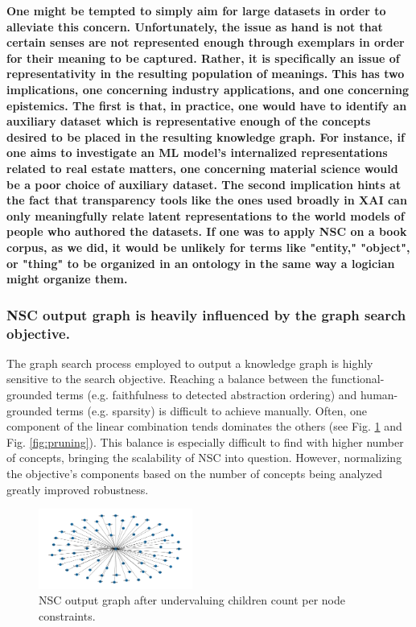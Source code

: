 \textbf{One might be tempted to simply aim for large datasets in order to alleviate this concern. Unfortunately, the issue as hand is not that certain senses are not represented enough through exemplars in order for their meaning to be captured. Rather, it is specifically an issue of representativity in the resulting population of meanings. This has two implications, one concerning industry applications, and one concerning epistemics. The first is that, in practice, one would have to identify an auxiliary dataset which is representative enough of the concepts desired to be placed in the resulting knowledge graph. For instance, if one aims to investigate an ML model's internalized representations related to real estate matters, one concerning material science would be a poor choice of auxiliary dataset. The second implication hints at the fact that transparency tools like the ones used broadly in XAI can only meaningfully relate latent representations to the world models of people who authored the datasets. If one was to apply NSC on a book corpus, as we did, it would be unlikely for terms like "entity," "object", or "thing" to be organized in an ontology in the same way a logician might organize them.}

\subsubsection{NSC output graph is heavily influenced by the graph search objective.}

The graph search process employed to output a knowledge graph is highly sensitive to the search objective. Reaching a balance between the functional-grounded terms (e.g. faithfulness to detected abstraction ordering) and human-grounded terms (e.g. sparsity) is difficult to achieve manually. Often, one component of the linear combination tends dominates the others (see Fig. \ref{fig:children} and Fig. \ref{fig:pruning}). This balance is especially difficult to find with higher number of concepts, bringing the scalability of NSC into question. However, normalizing the objective's components based on the number of concepts being analyzed greatly improved robustness.

\begin{figure}[h]
\centering
\includegraphics[width=0.45\textwidth]{img/too_much_pruning.png}
\caption{NSC output graph after undervaluing children count per node constraints.}\label{fig:children}
\end{figure}

